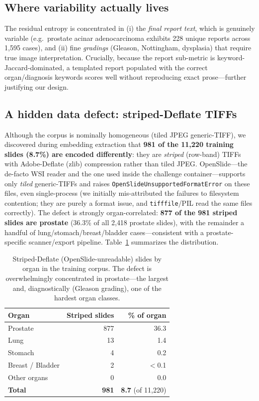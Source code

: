 \documentclass[11pt,a4paper]{article}
\newcommand{\code}[1]{\texttt{\small #1}}
\begin{document}
\subsection{Where variability actually lives}
The residual entropy is concentrated in (i) the \emph{final report text}, which is genuinely
variable (e.g.\ prostate acinar adenocarcinoma exhibits 228 unique reports across 1{,}595
cases), and (ii) fine \emph{gradings} (Gleason, Nottingham, dysplasia) that require true image
interpretation. Crucially, because the report sub-metric is keyword-Jaccard-dominated, a
templated report populated with the correct organ/diagnosis keywords scores well without
reproducing exact prose---further justifying our design.

\subsection{A hidden data defect: striped-Deflate TIFFs}
\label{sec:striped}
Although the corpus is nominally homogeneous (tiled JPEG generic-TIFF), we discovered during
embedding extraction that \textbf{981 of the 11{,}220 training slides (8.7\%) are encoded
differently}: they are \emph{striped} (row-band) TIFFs with Adobe-Deflate (zlib) compression
rather than tiled JPEG. OpenSlide---the de-facto WSI reader and the one used inside the challenge
container---supports only \emph{tiled} generic-TIFFs and raises
\code{OpenSlideUnsupportedFormatError} on these files, even single-process (we initially
mis-attributed the failures to filesystem contention; they are purely a format issue, and
\code{tifffile}/PIL read the same files correctly). The defect is strongly organ-correlated:
\textbf{877 of the 981 striped slides are prostate} (36.3\% of all 2{,}418 prostate slides),
with the remainder a handful of lung/stomach/breast/bladder cases---consistent with a
prostate-specific scanner/export pipeline. Table~\ref{tab:striped} summarizes the distribution.

\begin{table}[h]
\centering
\caption{Striped-Deflate (OpenSlide-unreadable) slides by organ in the training corpus. The defect
is overwhelmingly concentrated in prostate---the largest and, diagnostically (Gleason grading), one
of the hardest organ classes.}
\label{tab:striped}
\begin{tabular}{lrr}
\toprule
Organ & Striped slides & \% of organ \\
\midrule
Prostate        & 877 & 36.3 \\
Lung            & 13  & 1.4 \\
Stomach         & 4   & 0.2 \\
Breast / Bladder & 2   & $<$0.1 \\
Other organs    & 0   & 0.0 \\
\midrule
\textbf{Total}  & \textbf{981} & \textbf{8.7} (of 11{,}220) \\
\bottomrule
\end{tabular}
\end{table}
\end{document}
